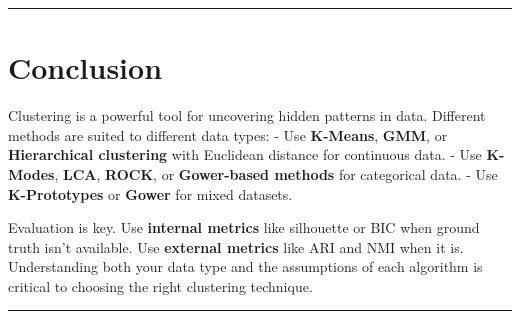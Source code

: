 \documentclass[
  letterpaper,
  DIV=11,
  numbers=noendperiod]{scrartcl}
\begin{document}
\begin{center}\rule{0.5\linewidth}{0.5pt}\end{center}

\section{Conclusion}\label{conclusion}

Clustering is a powerful tool for uncovering hidden patterns in data.
Different methods are suited to different data types: - Use
\textbf{K-Means}, \textbf{GMM}, or \textbf{Hierarchical clustering} with
Euclidean distance for continuous data. - Use \textbf{K-Modes},
\textbf{LCA}, \textbf{ROCK}, or \textbf{Gower-based methods} for
categorical data. - Use \textbf{K-Prototypes} or \textbf{Gower} for
mixed datasets.

Evaluation is key. Use \textbf{internal metrics} like silhouette or BIC
when ground truth isn't available. Use \textbf{external metrics} like
ARI and NMI when it is. Understanding both your data type and the
assumptions of each algorithm is critical to choosing the right
clustering technique.

\begin{center}\rule{0.5\linewidth}{0.5pt}\end{center}
\end{document}
